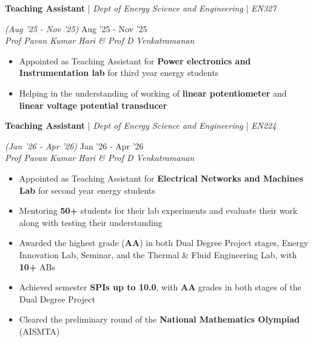 \documentclass[10pt]{article}
\newcommand{\xfill}[2][1ex]{
	\dimen0=#2\advance\dimen0 by #1
	\leaders\hrule height \dimen0 depth -#1\hfill
}
\renewcommand{\section}[1]{
	\vspace{4pt}
	{\color{RoyalBlue}{\Large\scshape\raggedright #1\xfill[0pt]{0.5pt}}}
}
\renewcommand{\subsection}[5]{
	\def\temp{#4}
	\vspace{2pt}
	{
		\large
		{\textbf{#1}} | {\sl #2} | {\sl #3} \filldate{#4}
		\ifx\temp\empty
		\else
		{
			\\[0.1em]
			\fontsize{11}{13.2}\selectfont
			\sl #5
		}
		\fi
	}
}
\newcommand{\filldate}[1]{\strut\hfill {\small \textit{(#1)}}}
\begin{document}
\section{Positions of Responsibility}

\subsection{Teaching Assistant}{Dept of Energy Science and Engineering}{EN327}{Aug '25 - Nov '25}{Prof Pavan Kumar Hari \& Prof D Venkatramanan}
\begin{itemize}
	\item Appointed as Teaching Assistant for \textbf{Power electronics and Instrumentation lab} for third year energy  students
	\item Helping in the understanding of working of \textbf{linear potentiometer} and \textbf{linear voltage potential transducer}
\end{itemize}

\subsection{Teaching Assistant}{Dept of Energy Science and Engineering}{EN224}{Jan '26 - Apr '26}{Prof Pavan Kumar Hari \& Prof D Venkatramanan}
\begin{itemize}
	\item Appointed as Teaching Assistant for \textbf{Electrical Networks and Machines Lab} for second year energy  students
	\item Mentoring \textbf{50+} students for their lab experiments and evaluate their work along with testing their understanding
\end{itemize}

\section{Scholastic Achievements}

\vspace{2pt}
\begin{itemize}
	\item Awarded the highest grade (\textbf{AA}) in both Dual Degree Project stages, Energy Innovation Lab, Seminar, and the Thermal \& Fluid Engineering Lab, with \textbf{10+} ABs
	\item Achieved semester \textbf{SPIs up to 10.0}, with \textbf{AA} grades in both stages of the Dual Degree Project
	\item Cleared the preliminary round of the \textbf{National Mathematics Olympiad} (AISMTA)
\end{itemize}
\end{document}
